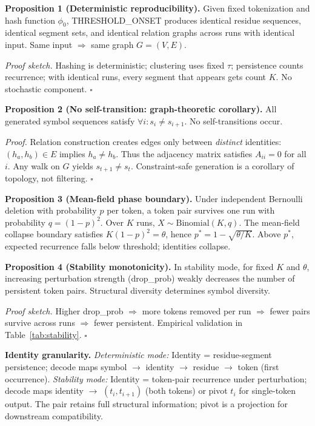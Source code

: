 \documentclass[10pt]{article}
\begin{document}
\textbf{Proposition 1 (Deterministic reproducibility).}
Given fixed tokenization and hash function $\phi_0$, THRESHOLD\_ONSET produces identical residue sequences, identical segment sets, and identical relation graphs across runs with identical input. Same input $\Rightarrow$ same graph $G = (V, E)$.

\textit{Proof sketch.} Hashing is deterministic; clustering uses fixed $\tau$; persistence counts recurrence; with identical runs, every segment that appears gets count $K$. No stochastic component. $\square$

\textbf{Proposition 2 (No self-transition: graph-theoretic corollary).}
All generated symbol sequences satisfy $\forall i: s_i \neq s_{i+1}$. No self-transitions occur.

\textit{Proof.} Relation construction creates edges only between \emph{distinct} identities: $(h_a, h_b) \in E$ implies $h_a \neq h_b$. Thus the adjacency matrix satisfies $A_{ii} = 0$ for all $i$. Any walk on $G$ yields $s_{t+1} \neq s_t$. Constraint-safe generation is a corollary of topology, not filtering. $\square$

\textbf{Proposition 3 (Mean-field phase boundary).}
Under independent Bernoulli deletion with probability $p$ per token, a token pair survives one run with probability $q = (1-p)^2$. Over $K$ runs, $X \sim \text{Binomial}(K, q)$. The mean-field collapse boundary satisfies $K(1-p)^2 = \theta$, hence $p^* = 1 - \sqrt{\theta/K}$. Above $p^*$, expected recurrence falls below threshold; identities collapse.

\textbf{Proposition 4 (Stability monotonicity).}
In stability mode, for fixed $K$ and $\theta$, increasing perturbation strength (drop\_prob) weakly decreases the number of persistent token pairs. Structural diversity determines symbol diversity.

\textit{Proof sketch.} Higher drop\_prob $\Rightarrow$ more tokens removed per run $\Rightarrow$ fewer pairs survive across runs $\Rightarrow$ fewer persistent. Empirical validation in Table~\ref{tab:stability}. $\square$

\textbf{Identity granularity.}
\textit{Deterministic mode:} Identity = residue-segment persistence; decode maps symbol $\rightarrow$ identity $\rightarrow$ residue $\rightarrow$ token (first occurrence). \textit{Stability mode:} Identity = token-pair recurrence under perturbation; decode maps identity $\rightarrow$ $(t_i, t_{i+1})$ (both tokens) or pivot $t_i$ for single-token output. The pair retains full structural information; pivot is a projection for downstream compatibility.
\end{document}
